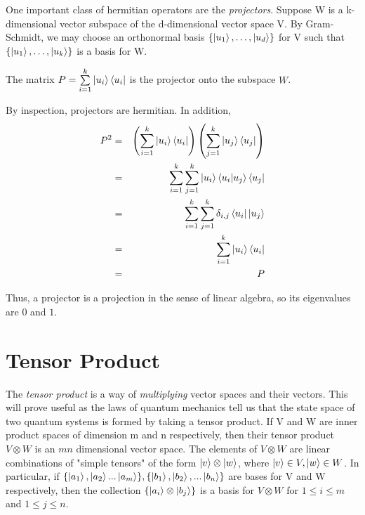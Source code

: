 One important class of hermitian operators are the \textit{projectors}. Suppose W is a k-dimensional vector subspace of the d-dimensional vector space V. By Gram-Schmidt, we may choose an orthonormal basis $\{\ket{u_1}, \hdots, \ket{u_d}\}$ for V such that $\{\ket{u_1}, \hdots, \ket{u_k}\}$ is a basis for W.  
\begin{definition}
The matrix $P=\sum\limits_{i=1}^k \ket{u_i} \bra{u_i}$ is the projector onto the subspace $W$.
\end{definition}
By inspection, projectors are hermitian.  In addition,
\begin{eqnarray}
    P^2&=&\left(\sum_{i=1}^k \ket{u_i} \bra{u_i}\right)\left(\sum_{j=1}^k \ket{u_j} \bra{u_j}\right)\\
    &=&\sum_{i=1}^k \sum_{j=1}^k \ket{u_i} \braket{u_i|u_j} \bra{u_j}\\
    &=&\sum_{i=1}^k \sum_{j=1}^k\delta_{i,j}\bra{u_i}\ket{u_j}\\
    &=&\sum_{i=1}^k \ket{u_i} \bra{u_i}\\
    &=&P
    \end{eqnarray}

Thus, a projector is a projection in the sense of linear algebra, so its eigenvalues are $0$ and $1$.


\pagebreak
\section{Tensor Product}

The \textit{tensor product} is a way of {\emph{multiplying}} vector spaces and their vectors. This will prove useful as the laws of quantum mechanics tell us that the state space of two quantum systems is formed by taking a tensor product. If V and W are inner product spaces of dimension m and n respectively, then their tensor product $V \otimes W$ is an $mn$ dimensional vector space. The elements of $V \otimes W$ are linear combinations of "simple tensors" of the form $\ket{v} \otimes \ket{w}$, where $\ket{v} \in V, \ket{w} \in W$. In particular, if $\{\ket{a_1}, \ket{a_2}...\ket{a_m}\}, \{\ket{b_1},\ket{b_2}, ...\ket{b_n}\}$ are bases for V and W respectively, then the collection $\{\ket{a_i}\otimes\ket{b_j}\}$ is a basis for $V \otimes W$ for $1\leq i \leq m$ and $1 \leq j \leq n$.


